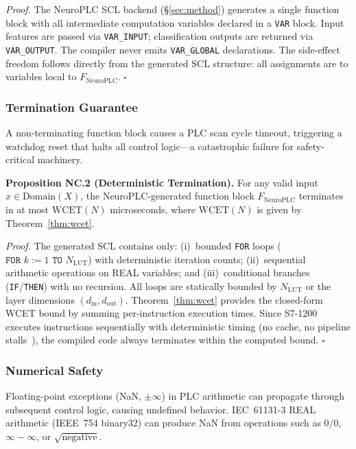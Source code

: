 \vspace{2pt}
\noindent\textit{Proof.}
The NeuroPLC SCL backend ({\S}\ref{sec:method})
generates a single function block with all intermediate computation
variables declared in a \texttt{VAR} block. Input features are passed
via \texttt{VAR\_INPUT}; classification outputs are returned via
\texttt{VAR\_OUTPUT}. The compiler never emits \texttt{VAR\_GLOBAL}
declarations. The side-effect freedom follows directly from the
generated SCL structure: all assignments are to variables local to
$F_{\text{NeuroPLC}}$. $\square$

\subsubsection{Termination Guarantee}

A non-terminating function block causes a PLC scan cycle timeout,
triggering a watchdog reset that halts all control logic---a
catastrophic failure for safety-critical machinery.

\vspace{4pt}
\noindent\textbf{Proposition NC.2 (Deterministic Termination).}
\label{prop:termination}
For any valid input $x \in \text{Domain}(X)$, the NeuroPLC-generated
function block $F_{\text{NeuroPLC}}$ terminates in at most
$\text{WCET}(N)$ microseconds, where $\text{WCET}(N)$ is given by
Theorem~\ref{thm:wcet}.

\vspace{2pt}
\noindent\textit{Proof.}
The generated SCL contains only: (i)~bounded \texttt{FOR} loops
($\texttt{FOR } k := 1 \texttt{ TO } N_{\text{LUT}}$) with deterministic
iteration counts; (ii)~sequential arithmetic operations on REAL
variables; and (iii)~conditional branches (\texttt{IF}/\texttt{THEN})
with no recursion. All loops are statically bounded by $N_{\text{LUT}}$
or the layer dimensions $(d_{\text{in}}, d_{\text{out}})$.
Theorem~\ref{thm:wcet} provides the closed-form WCET bound by summing
per-instruction execution times. Since S7-1200 executes instructions
sequentially with deterministic timing (no cache, no pipeline
stalls~\cite{siemens_s7_1200_2022}), the compiled code always
terminates within the computed bound. $\square$

\subsubsection{Numerical Safety}

Floating-point exceptions (NaN, $\pm\infty$) in PLC arithmetic can
propagate through subsequent control logic, causing undefined behavior.
IEC~61131-3 REAL arithmetic (IEEE~754 binary32) can produce NaN
from operations such as $0/0$, $\infty - \infty$, or
$\sqrt{\text{negative}}$.

